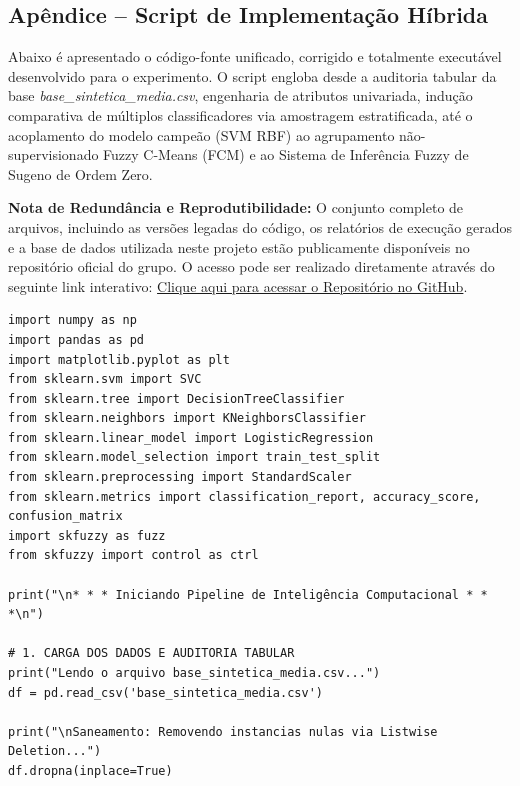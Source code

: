 \documentclass[journal]{IEEEtran}
\begin{document}
\begin{onecolumn} %

\section*{Apêndice -- Script de Implementação Híbrida}

Abaixo é apresentado o código-fonte unificado, corrigido e totalmente executável desenvolvido para o experimento. O script engloba desde a auditoria tabular da base \textit{base\_sintetica\_media.csv}, engenharia de atributos univariada, indução comparativa de múltiplos classificadores via amostragem estratificada, até o acoplamento do modelo campeão (SVM RBF) ao agrupamento não-supervisionado Fuzzy C-Means (FCM) e ao Sistema de Inferência Fuzzy de Sugeno de Ordem Zero.

\vspace{0.3cm}
\noindent\textbf{Nota de Redundância e Reprodutibilidade:} O conjunto completo de arquivos, incluindo as versões legadas do código, os relatórios de execução gerados e a base de dados utilizada neste projeto estão publicamente disponíveis no repositório oficial do grupo. O acesso pode ser realizado diretamente através do seguinte link interativo: \href{https://github.com/geovanemorcatti/fussy_artigo-.git}{Clique aqui para acessar o Repositório no GitHub}.
\vspace{0.3cm}

\begin{verbatim}
import numpy as np
import pandas as pd
import matplotlib.pyplot as plt
from sklearn.svm import SVC
from sklearn.tree import DecisionTreeClassifier
from sklearn.neighbors import KNeighborsClassifier
from sklearn.linear_model import LogisticRegression
from sklearn.model_selection import train_test_split
from sklearn.preprocessing import StandardScaler
from sklearn.metrics import classification_report, accuracy_score, confusion_matrix
import skfuzzy as fuzz
from skfuzzy import control as ctrl

print("\n* * * Iniciando Pipeline de Inteligência Computacional * * *\n")

# 1. CARGA DOS DADOS E AUDITORIA TABULAR
print("Lendo o arquivo base_sintetica_media.csv...")
df = pd.read_csv('base_sintetica_media.csv')

print("\nSaneamento: Removendo instancias nulas via Listwise Deletion...")
df.dropna(inplace=True)


\end{verbatim}
\end{onecolumn}
\end{document}
